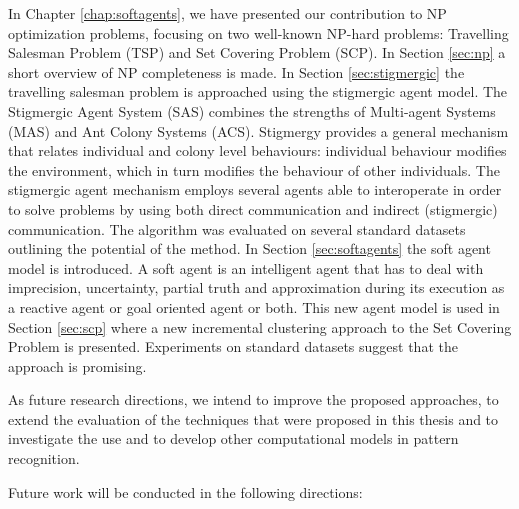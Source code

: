 In Chapter \ref{chap:softagents}, we have presented our contribution to NP optimization problems, focusing on two  well-known NP-hard problems: Travelling Salesman Problem (TSP) and Set Covering Problem (SCP).
In Section \ref{sec:np} a short overview of NP completeness is made. In Section \ref{sec:stigmergic} the travelling salesman problem is approached using the stigmergic agent model. The Stigmergic Agent System (SAS) combines the strengths of Multi-agent Systems (MAS) and Ant Colony Systems (ACS).  Stigmergy provides a general mechanism that relates individual and colony level behaviours: individual behaviour modifies the environment, which in turn modifies the behaviour of other individuals. The stigmergic agent mechanism employs several agents able to interoperate in order to solve problems by using both direct communication and indirect (stigmergic) communication. The algorithm was evaluated on several standard datasets outlining the potential of the method. 
In Section \ref{sec:softagents} the soft agent model is introduced. A soft agent is an intelligent agent that has to deal with imprecision, uncertainty, partial truth and approximation during its execution as a reactive agent or goal oriented agent or both. This new agent model is used in Section \ref{sec:scp} where a new incremental clustering approach to the Set Covering Problem is presented. Experiments on standard datasets suggest that the approach is promising. 

As future research directions, we intend to improve the proposed approaches, to extend the evaluation of the techniques that were proposed in this thesis and to investigate the use and to develop other computational models in pattern recognition. 

Future work will be conducted in the following directions:

